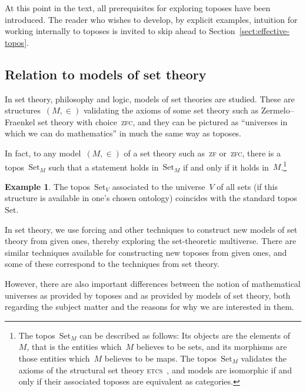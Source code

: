 \documentclass[oneside,reqno]{amsart}
\theoremstyle{definition}
\newtheorem{ex}[defn]{Example}
\theoremstyle{plain}
\theoremstyle{remark}
\newcommand{\Set}{\mathrm{Set}}
\renewcommand{\_}{\mathpunct{.}\,}
\newcommand{\?}{\,{:}\,}
\begin{document}

At this point in the text, all prerequisites for exploring toposes have been
introduced. The reader who wishes to develop, by explicit examples, intuition
for working internally to toposes is invited to skip ahead to
Section~\ref{sect:effective-topos}.


\subsection{Relation to models of set theory} In set theory, philosophy and
logic, models of set theories are studied. These are structures~$(M,\in)$
validating the axioms of some set theory such as Zermelo--Fraenkel set theory
with choice~\textsc{zfc}, and they can be pictured as ``universes in which we
can do mathematics'' in much the same way as toposes.

In fact, to any model~$(M,\in)$ of a set theory such as~\textsc{zf}
or~\textsc{zfc}, there is a topos~$\Set_M$ such that a statement holds
in~$\Set_M$ if and only if it holds in~$M$.\footnote{The topos~$\Set_M$ can be
described as follows: Its objects are the elements of~$M$, that is the entities
which~$M$ believes to be sets, and its morphisms are those entities which~$M$
believes to be maps. The topos~$\Set_M$ validates the axioms of the structural
set theory \textsc{etcs}~\cite{mclarty:structuralism,marquis:foundations,barton-friedman:structures}, and models are isomorphic if and only if their
associated toposes are equivalent as categories.}

\begin{ex}The topos~$\Set_V$ associated to the universe~$V$ of all sets (if
this structure is available in one's chosen ontology) coincides with the
standard topos~$\Set$.\end{ex}

In set theory, we use forcing and other techniques to construct new
models of set theory from given ones, thereby exploring the set-theoretic
multiverse. There are similar techniques available for constructing new toposes
from given ones, and some of these correspond to the techniques from set
theory.

However, there are also important differences between the notion of mathematical
universes as provided by toposes and as provided by models of set theory, both
regarding the subject matter and the reasons for why we are interested in them.
\end{document}
